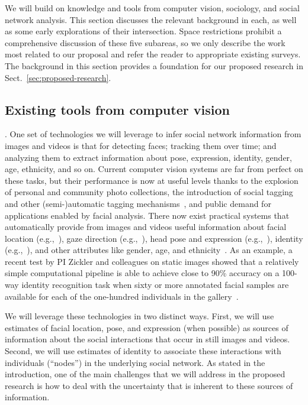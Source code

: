 
We will build on knowledge and tools from computer vision, sociology, and social network analysis. This section discusses the relevant background in each, as well as some early explorations of their intersection. Space restrictions prohibit a comprehensive discussion of these five subareas, so we only describe the work most related to our proposal and refer the reader to appropriate existing surveys. The background in this section provides a foundation for our proposed research in Sect.~\ref{sec:proposed-research}.

\subsection{Existing tools from computer vision}

. One set of technologies we will leverage to infer social network information from images and videos is that for detecting faces; tracking them over time; and analyzing them to extract information about pose, expression, identity, gender, age, ethnicity, and so on.  Current computer vision systems are  far from perfect on these tasks, but their performance is now at useful levels thanks to the explosion of personal and community photo collections, the introduction of social tagging~\cite{Stone2008,Stone2010} and other (semi-)automatic tagging mechanisms~\cite{berg2004naf,berg2005sp,Everingham06a,huang:lfw,YangBKR12}, and public demand for applications enabled by facial analysis. There now exist practical systems that automatically provide from images and videos useful information about facial location (e.g.,~\cite{ViolaJones,Zhang:detect,Comaniciu:track}), gaze direction (e.g.,~\cite{Hanson}), head pose and expression (e.g.,~\cite{Murphy-Chutorian:pose,Matthews:AAM,Lucey:AAM,Mumford:face,Yacoob:expression,delaTorre:expression,Essa:expression,huang:lfw,HolubMoreelsPeronaFG08}), identity (e.g.,~\cite{Chellappa:face}), and other attributes like gender, age, and ethnicity~\cite{LNCS53050340}. As  an example, a recent test by PI Zickler and colleagues on static images showed that a relatively simple computational pipeline is able to achieve close to 90\% accuracy on a 100-way identity recognition task when sixty or more annotated facial samples are available for each of the one-hundred individuals in the gallery~\cite{PintoZickler2011}. 

We will leverage these technologies in two distinct ways. First, we will use estimates of facial location, pose, and expression (when possible) as sources of information about the social interactions that occur in still images and videos. Second, we will use estimates of identity to associate these interactions with individuals (``nodes'') in the underlying social network. As stated in the introduction, one of the main challenges that we will address  in the proposed research is how to deal with the uncertainty that is inherent to these sources of information. 


